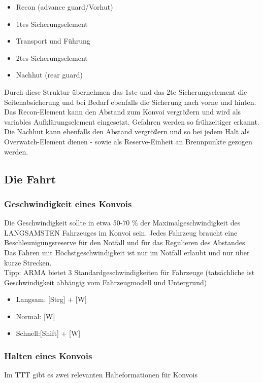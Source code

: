	\begin{itemize}
		\item Recon (advance guard/Vorhut)
		\item 1tes Sicherungselement
		\item Transport und Führung
		\item 2tes Sicherungselement
		\item Nachhut (rear guard)
	\end{itemize}

	Durch diese Struktur übernehmen das 1ste und das 2te Sicherungselement die Seitenabsicherung und bei Bedarf ebenfalls die Sicherung nach vorne und hinten. Das Recon-Element kann den Abstand zum Konvoi vergrößern und wird als variables Aufklärungselement eingesetzt. Gefahren werden so frühzeitiger erkannt. Die Nachhut kann ebenfalls den Abstand vergrößern und so bei jedem Halt als Overwatch-Element dienen - sowie als Reserve-Einheit an Brennpunkte gezogen werden. \\

\subsection{Die Fahrt}
\subsubsection{Geschwindigkeit eines Konvois}
	Die Geschwindigkeit sollte in etwa 50-70 \% der Maximalgeschwindigkeit des LANGSAMSTEN Fahrzeuges im Konvoi sein. Jedes Fahrzeug braucht eine Beschleunigungsreserve für den Notfall und für das Regulieren des Abstandes. Das Fahren mit Höchstgeschwindigkeit ist nur im Notfall erlaubt und nur über kurze Strecken. \\
	Tipp: ARMA bietet 3 Standardgeschwindigkeiten für Fahrzeuge (tatsächliche ist Geschwindigkeit abhängig vom Fahrzeugmodell und Untergrund) \\

	\begin{itemize}
		\item Langsam: [Strg] + [W]
		\item Normal: [W]
		\item Schnell:[Shift] + [W]
	\end{itemize}

\subsubsection{Halten eines Konvois}
	Im TTT gibt es zwei relevanten Halteformationen für Konvois

